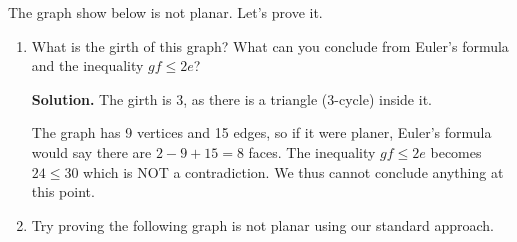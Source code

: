 \documentclass{book}
\begin{document}
\setcounter{project}{29}
\addtocounter{project}{-1}
\begin{activity}[]\label{activity-24}
\hypertarget{p-300}{}%
The graph show below is not planar.  Let's prove it.%
\begin{sidebyside}{1}{0.375}{0.375}{0}
\begin{sbspanel}{0.25}
\end{sbspanel}
\end{sidebyside}
\begin{enumerate}[font=\bfseries,label=(\alph*),ref=\alph*]
\item\label{task-41} \hypertarget{p-301}{}%
What is the girth of this graph?  What can you conclude from Euler's formula and the inequality \(gf \le 2e\)?%
\par\smallskip%
\noindent\textbf{Solution.}\hypertarget{solution-22}{}\quad%
\hypertarget{p-302}{}%
The girth is 3, as there is a triangle (3-cycle) inside it.%
\par
\hypertarget{p-303}{}%
The graph has 9 vertices and  15 edges, so if it were planer, Euler's formula would say there are \(2-9+15 = 8\) faces.  The inequality \(gf \le 2e\) becomes \(24 \le 30\) which is NOT a contradiction.  We thus cannot conclude anything at this point.%
\item\label{task-42} \hypertarget{p-304}{}%
Try proving the following graph is not planar using our standard approach.%
\begin{sidebyside}{1}{0.375}{0.375}{0}
\begin{sbspanel}{0.25}
\end{sbspanel}
\end{sidebyside}

\end{enumerate}
\end{activity}
\end{document}
